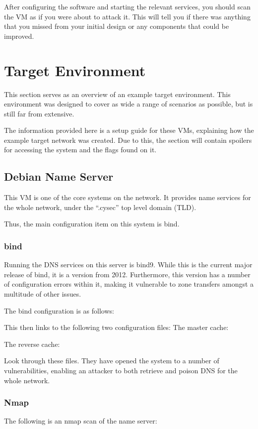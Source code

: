 			After configuring the software and starting the relevant services, you should scan the VM as if you were about to attack it. 
			This will tell you if there was anything that you missed from your initial design or any components that could be improved. 

	\section{Target Environment}
		This section serves as an overview of an example target environment. 
		This environment was designed to cover as wide a range of scenarios as possible, but is still far from extensive\cite{CTFBlueprints}.

		The information provided here is a setup guide for these VMs, explaining how the example target network was created. 
		Due to this, the section will contain spoilers for accessing the system and the flags found on it. 
		\subsection{Debian Name Server}
			This VM is one of the core systems on the network. 
			It provides name services for the whole network, under the ``.cysec'' top level domain (TLD).

			Thus, the main configuration item on this system is bind. 
			\subsubsection{bind}
				Running the DNS services on this server is bind9. 
				While this is the current major release of bind, it is a version from 2012. 
				Furthermore, this version has a number of configuration errors within it, making it vulnerable to zone transfers amongst a multitude of other issues. 

				The bind configuration is as follows:
				

				This then links to the following two configuration files:
				The master cache:
				
				The reverse cache:
				

				Look through these files. 
				They have opened the system to a number of vulnerabilities, enabling an attacker to both retrieve and poison DNS for the whole network. 

			\subsubsection{Nmap}
				The following is an nmap scan of the name server:
				
